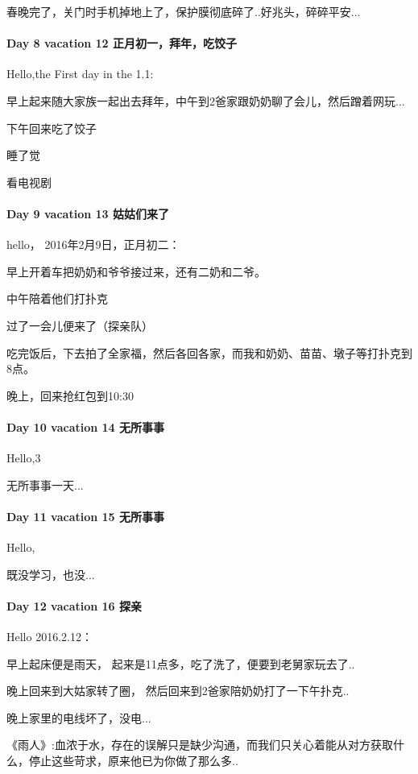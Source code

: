 \documentclass[UTF8,a4paper,8pt]{ctexbook}
\begin{document}
	 	 春晚完了，关门时手机掉地上了，保护膜彻底碎了..好兆头，碎碎平安...
 	 \paragraph{Day 8   vacation 12    \quad    正月初一，拜年，吃饺子 }
	 	 Hello,the First day in the 1.1:
	 	 
	 	 早上起来随大家族一起出去拜年，中午到2爸家跟奶奶聊了会儿，然后蹭着网玩...
	 	 
	 	 下午回来吃了饺子
	 	 
	 	 睡了觉
	 	 
	 	 看电视剧
 	 \paragraph{Day 9   vacation 13    \quad  姑姑们来了   }
	 	 hello， 2016年2月9日，正月初二：
	 	 
	 	 早上开着车把奶奶和爷爷接过来，还有二奶和二爷。
	 	 
	 	 中午陪着他们打扑克
	 	 
	 	 过了一会儿便来了（探亲队）
	 	 
	 	 吃完饭后，下去拍了全家福，然后各回各家，而我和奶奶、苗苗、墩子等打扑克到8点。
	 	 
	 	 晚上，回来抢红包到10:30
 	 \paragraph{Day 10  vacation 14   \quad 无所事事}
	 	 Hello,3
	 	 
	 	 无所事事一天...
	 	 
 	 \paragraph{Day 11  vacation 15    \quad   无所事事  }
 	 
	 	 Hello, 
	 	 
	 	 既没学习，也没...
 	 \paragraph{Day 12  vacation 16    \quad   探亲  }
	 	 Hello 2016.2.12：
	 	 
	 	 早上起床便是雨天， 起来是11点多，吃了洗了，便要到老舅家玩去了..
	 	 
	 	 晚上回来到大姑家转了圈， 然后回来到2爸家陪奶奶打了一下午扑克..
	 	 
	 	 晚上家里的电线坏了，没电...
	 	 
	 	 
	 	 《雨人》:血浓于水，存在的误解只是缺少沟通，而我们只关心着能从对方获取什么，停止这些苛求，原来他已为你做了那么多..
\end{document}
